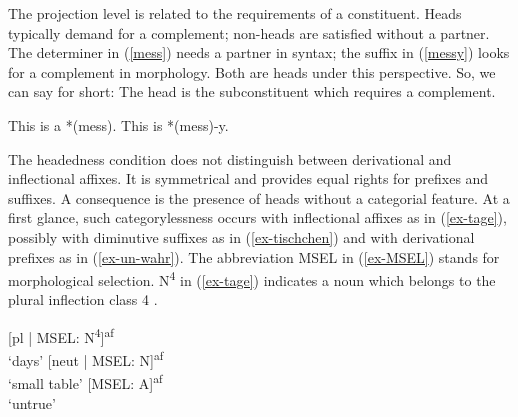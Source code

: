 \documentclass[output=paper
  ,nobabel
  ,draftmode
  ,colorlinks, citecolor=brown
]{langscibook}
\begin{document}
\noindent The projection level is related to the requirements of a constituent. Heads typically demand for a complement; non-heads are satisfied without a partner. The determiner in (\ref{mess}) needs a partner in syntax; the suffix in (\ref{messy}) looks for a complement in morphology. Both are heads under this perspective. So, we can say for short: The head is the subconstituent which requires a complement.

\eal
\ex\label{mess} This is a *(mess).
\ex\label{messy}
This is *(mess)-y.
\zl

\noindent 
The headedness condition does not distinguish between derivational and inflectional affixes. It is symmetrical and provides equal rights for prefixes and suffixes. A consequence is the presence of heads without a categorial feature. At a first glance, such categorylessness occurs with inflectional affixes as in (\ref{ex-tage}), possibly with diminutive suffixes as in (\ref{ex-tischchen}) and with derivational prefixes as in (\ref{ex-un-wahr}). The abbreviation MSEL in (\ref{ex-MSEL}) stands for morphological selection. N\textsuperscript{4} in (\ref{ex-tage}) indicates a noun which belongs to the plural inflection class 4 \citep[cf.][29]{IDS97}.

\eal\label{ex-MSEL}
\ex\label{ex-tage}
  \hspace{41pt} [pl | MSEL: N\textsuperscript{4}]\textsuperscript{af}\\
`days'
\ex\label{ex-tischchen}
 \hspace{15.5pt} [neut | MSEL: N]\textsuperscript{af}\\
`small table'
\ex\label{ex-un-wahr}
 \hspace{27pt} [MSEL: A]\textsuperscript{af}\\
`untrue' 
\zl
\end{document}
